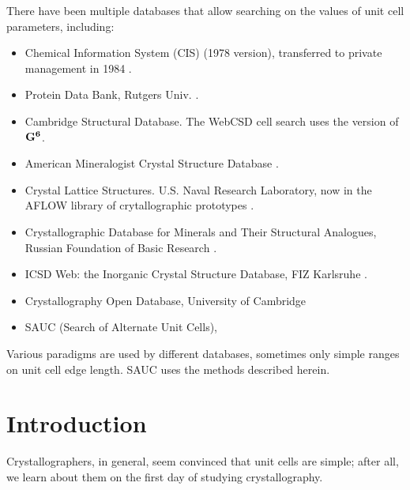 \documentclass[preprint]{iucr}              %
\numberwithin{equation}{section}
\newcommand{\GVI}[0]{$\bf{G^{6}}$}
\begin{document}
	There have been multiple databases that allow searching
	on the values of unit cell parameters, including:
		\begin{itemize}
			\label{databases}
		
		\item Chemical Information System (CIS) (1978 version),
		 transferred to private management in 1984 \cite{kadec1985transfer}.
		 
		\item Protein Data Bank, Rutgers Univ. \cite{Bernstein1977} \cite{Berman2000}.
		
		\item Cambridge Structural Database.  The WebCSD 
		\cite{hayward2019cambridge}	cell search uses the
		\cite{hayward2019cambridge} version of \GVI{}.
		
		\item American Mineralogist Crystal Structure Database \cite{downs2003american}.
		
		\item Crystal Lattice Structures. U.S. Naval Research Laboratory, now in the
		AFLOW library of crytallographic prototypes \cite{mehl2017aflow}.
		
		\item Crystallographic Database for Minerals and Their Structural Analogues, 
		Russian Foundation of Basic Research
		\cite{chichagov2001mincryst}.
		
		\item ICSD Web: the Inorganic Crystal Structure Database, FIZ Karlsruhe
		\cite{ruhl2019inorganic}.
		
		\item Crystallography Open Database, University of Cambridge \cite{gravzulis2012crystallography} 
		
		\item  SAUC (Search of Alternate Unit Cells),  \cite{McGill2014}
	\end{itemize}

Various paradigms are used 
by different databases, sometimes only simple ranges on unit cell
edge length. SAUC uses the methods described herein.	
	
\section{Introduction}

Crystallographers, in general, seem convinced that unit cells
are simple; after all, we learn about them on the first day of
studying crystallography.
\end{document}

